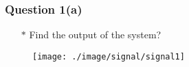 \documentclass{beamer}
\begin{document}

\begin{frame}
\frametitle{Question 1(a)}

\begin{itemize} \itemsep1pt \parskip0pt 
  \item[$\ast$] Find the output of the system?
\end{itemize}
\vspace{10 mm}


\begin{figure}[H]
  \centering
  \texttt{[image: ./image/signal/signal1]}
\end{figure}
\vspace{10 mm}

\end{frame}

\end{document}
